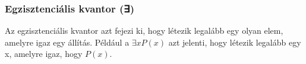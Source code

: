 \subsubsection{Egzisztenciális kvantor (∃)}

Az egzisztenciális kvantor azt fejezi ki, hogy létezik legalább egy olyan elem, amelyre igaz egy állítás. Például a $∃x P(x)$ azt jelenti, hogy létezik legalább egy x, amelyre igaz, hogy $P(x)$.
\begin{code}%
%
\>[6]\AgdaSpace{}%
\AgdaSymbol{:}\AgdaSpace{}%
\AgdaSymbol{\}}\AgdaSpace{}%
\AgdaSpace{}%
\AgdaSpace{}%
\AgdaSymbol{(}\AgdaSpace{}%
\AgdaSpace{}%
\AgdaSymbol{)}\AgdaSpace{}%
\AgdaSpace{}%
\AgdaSpace{}%
\<%
\end{code}

